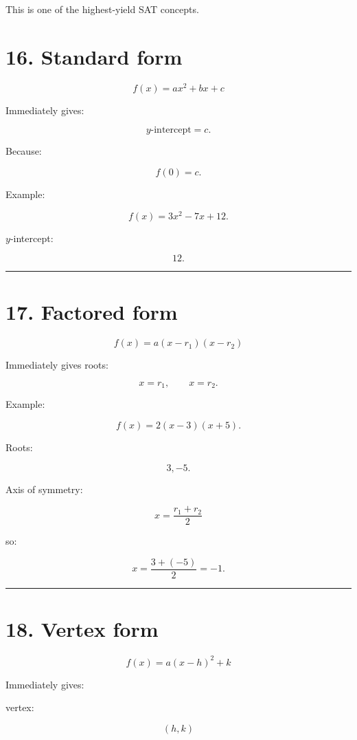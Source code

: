 \documentclass[
]{article}
\begin{document}
This is one of the highest-yield SAT concepts.

\section{16. Standard form}\label{standard-form}

\[
\boxed{f(x)=ax^2+bx+c}
\]

Immediately gives:

\[
y\text{-intercept}=c.
\]

Because:

\[
f(0)=c.
\]

Example:

\[
f(x)=3x^2-7x+12.
\]

\(y\)-intercept:

\[
\boxed{12}.
\]

\begin{center}\rule{0.5\linewidth}{0.5pt}\end{center}

\section{17. Factored form}\label{factored-form}

\[
\boxed{f(x)=a(x-r_1)(x-r_2)}
\]

Immediately gives roots:

\[
x=r_1,\qquad x=r_2.
\]

Example:

\[
f(x)=2(x-3)(x+5).
\]

Roots:

\[
\boxed{3,-5}.
\]

Axis of symmetry:

\[
x=\frac{r_1+r_2}{2}
\]

so:

\[
x=\frac{3+(-5)}2=-1.
\]

\begin{center}\rule{0.5\linewidth}{0.5pt}\end{center}

\section{18. Vertex form}\label{vertex-form}

\[
\boxed{f(x)=a(x-h)^2+k}
\]

Immediately gives:

vertex:

\[
\boxed{(h,k)}
\]
\end{document}
